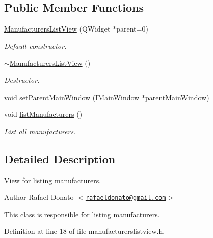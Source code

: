 \subsection*{\-Public \-Member \-Functions}
\begin{DoxyCompactItemize}
\item 
\hyperlink{class_manufacturers_list_view_a5b4c2f676f75632c6663d346f5aee205}{\-Manufacturers\-List\-View} (\-Q\-Widget $\ast$parent=0)
\begin{DoxyCompactList}\small\item\em \-Default constructor. \end{DoxyCompactList}\item 
\hyperlink{class_manufacturers_list_view_ab8b9ac23f420ac4e511b082d2b1be058}{$\sim$\-Manufacturers\-List\-View} ()
\begin{DoxyCompactList}\small\item\em \-Destructor. \end{DoxyCompactList}\item 
void \hyperlink{class_manufacturers_list_view_a1155618bc0a5455e32934a7f2e53eff0}{set\-Parent\-Main\-Window} (\hyperlink{class_i_main_window}{\-I\-Main\-Window} $\ast$parent\-Main\-Window)
\item 
void \hyperlink{class_manufacturers_list_view_a11f9c08d45302acc529a81ec1635100c}{list\-Manufacturers} ()
\begin{DoxyCompactList}\small\item\em \-List all manufacturers. \end{DoxyCompactList}\end{DoxyCompactItemize}


\subsection{\-Detailed \-Description}
\-View for listing manufacturers. 

\begin{DoxyAuthor}{\-Author}
\-Rafael \-Donato $<$\href{mailto:rafaeldonato@gmail.com}{\tt rafaeldonato@gmail.\-com}$>$
\end{DoxyAuthor}
\-This class is responsible for listing manufacturers. 

\-Definition at line 18 of file manufacturerslistview.\-h.



